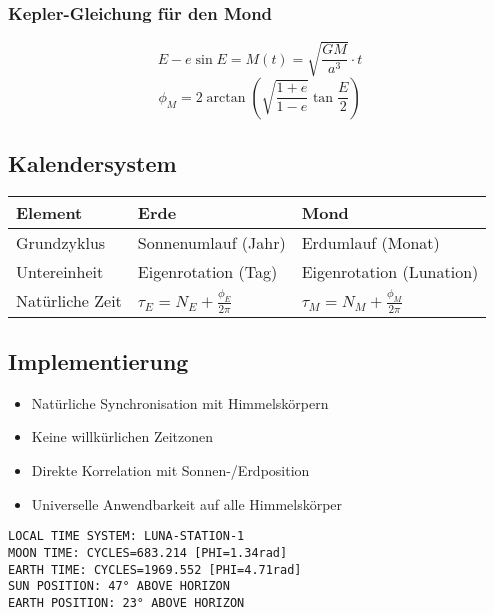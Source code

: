 \subsubsection{Kepler-Gleichung für den Mond}
\begin{equation}
E - e\sin E = M(t) = \sqrt{\frac{GM}{a^3}} \cdot t
\end{equation}
\begin{equation}
\phi_M = 2 \arctan\left(\sqrt{\frac{1+e}{1-e}} \tan\frac{E}{2}\right)
\end{equation}

\subsection{Kalendersystem}
\begin{tabular}{lll}
    \hline
    Element & Erde & Mond \\
    \hline
    Grundzyklus & Sonnenumlauf (Jahr) & Erdumlauf (Monat) \\
    Untereinheit & Eigenrotation (Tag) & Eigenrotation (Lunation) \\
    Natürliche Zeit & $\tau_E = N_E + \frac{\phi_E}{2\pi}$ & $\tau_M = N_M + \frac{\phi_M}{2\pi}$ \\
    \hline
\end{tabular}

\subsection{Implementierung}
\begin{itemize}
    \item Natürliche Synchronisation mit Himmelskörpern
    \item Keine willkürlichen Zeitzonen
    \item Direkte Korrelation mit Sonnen-/Erdposition
    \item Universelle Anwendbarkeit auf alle Himmelskörper
\end{itemize}

\begin{verbatim}
LOCAL TIME SYSTEM: LUNA-STATION-1
MOON TIME: CYCLES=683.214 [PHI=1.34rad]
EARTH TIME: CYCLES=1969.552 [PHI=4.71rad]
SUN POSITION: 47° ABOVE HORIZON
EARTH POSITION: 23° ABOVE HORIZON
\end{verbatim}